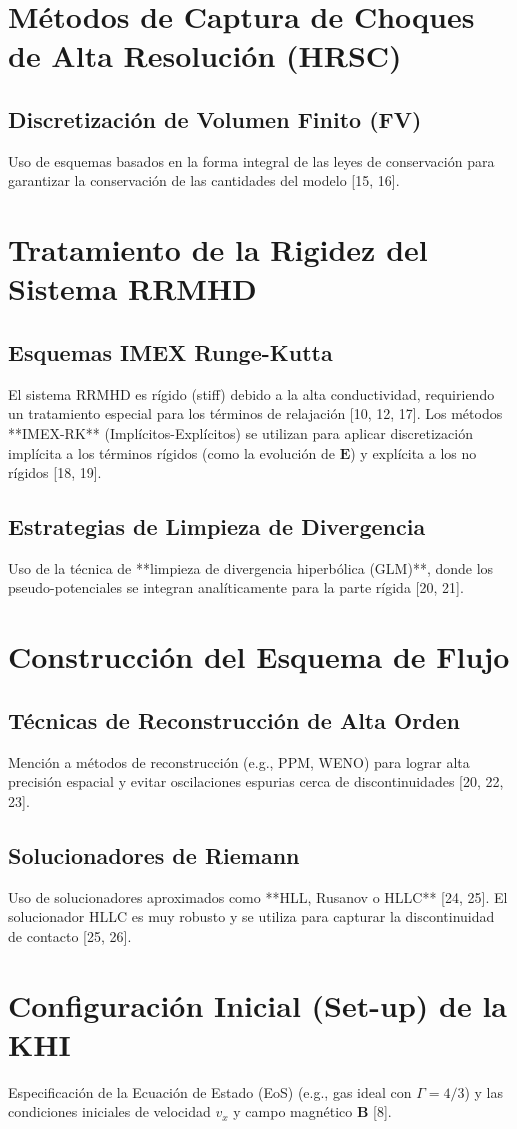 \section{Métodos de Captura de Choques de Alta Resolución (HRSC)}
    \subsection{Discretización de Volumen Finito (FV)}
        Uso de esquemas basados en la forma integral de las leyes de conservación para garantizar la conservación de las cantidades del modelo [15, 16].

\section{Tratamiento de la Rigidez del Sistema RRMHD}
    \subsection{Esquemas IMEX Runge-Kutta}
        El sistema RRMHD es rígido (stiff) debido a la alta conductividad, requiriendo un tratamiento especial para los términos de relajación [10, 12, 17]. Los métodos **IMEX-RK** (Implícitos-Explícitos) se utilizan para aplicar discretización implícita a los términos rígidos (como la evolución de $\mathbf{E}$) y explícita a los no rígidos [18, 19].
    \subsection{Estrategias de Limpieza de Divergencia}
        Uso de la técnica de **limpieza de divergencia hiperbólica (GLM)**, donde los pseudo-potenciales se integran analíticamente para la parte rígida [20, 21].

\section{Construcción del Esquema de Flujo}
    \subsection{Técnicas de Reconstrucción de Alta Orden}
        Mención a métodos de reconstrucción (e.g., PPM, WENO) para lograr alta precisión espacial y evitar oscilaciones espurias cerca de discontinuidades [20, 22, 23].
    \subsection{Solucionadores de Riemann}
        Uso de solucionadores aproximados como **HLL, Rusanov o HLLC** [24, 25]. El solucionador HLLC es muy robusto y se utiliza para capturar la discontinuidad de contacto [25, 26].

\section{Configuración Inicial (Set-up) de la KHI}
    Especificación de la Ecuación de Estado (EoS) (e.g., gas ideal con $\Gamma=4/3$) y las condiciones iniciales de velocidad $v_x$ y campo magnético $\mathbf{B}$ [8].
